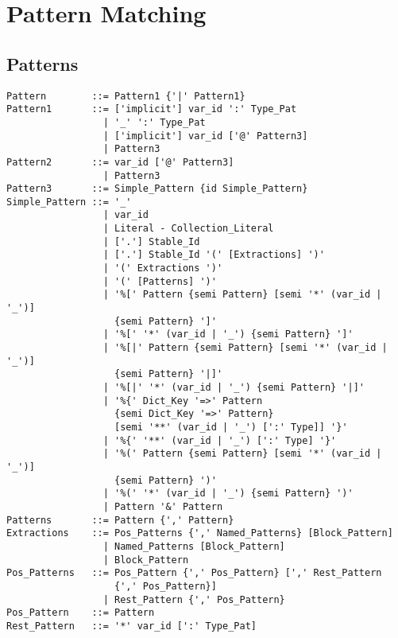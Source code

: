
\chapter{Pattern Matching}
\label{sec:pattern-matching}

\minitoc






\section{Patterns}
\label{sec:patterns}

\syntax\begin{lstlisting}
Pattern        ::= Pattern1 {'|' Pattern1}
Pattern1       ::= ['implicit'] var_id ':' Type_Pat
                 | '_' ':' Type_Pat
                 | ['implicit'] var_id ['@' Pattern3]
                 | Pattern3
Pattern2       ::= var_id ['@' Pattern3]
                 | Pattern3
Pattern3       ::= Simple_Pattern {id Simple_Pattern}
Simple_Pattern ::= '_'
                 | var_id
                 | Literal - Collection_Literal
                 | ['.'] Stable_Id
                 | ['.'] Stable_Id '(' [Extractions] ')' 
                 | '(' Extractions ')'
                 | '(' [Patterns] ')'
                 | '%[' Pattern {semi Pattern} [semi '*' (var_id | '_')] 
                   {semi Pattern} ']'
                 | '%[' '*' (var_id | '_') {semi Pattern} ']'
                 | '%[|' Pattern {semi Pattern} [semi '*' (var_id | '_')] 
                   {semi Pattern} '|]'
                 | '%[|' '*' (var_id | '_') {semi Pattern} '|]'
                 | '%{' Dict_Key '=>' Pattern 
                   {semi Dict_Key '=>' Pattern}
                   [semi '**' (var_id | '_') [':' Type]] '}'
                 | '%{' '**' (var_id | '_') [':' Type] '}'
                 | '%(' Pattern {semi Pattern} [semi '*' (var_id | '_')] 
                   {semi Pattern} ')'
                 | '%(' '*' (var_id | '_') {semi Pattern} ')'
                 | Pattern '&' Pattern
Patterns       ::= Pattern {',' Pattern}
Extractions    ::= Pos_Patterns {',' Named_Patterns} [Block_Pattern]
                 | Named_Patterns [Block_Pattern]
                 | Block_Pattern
Pos_Patterns   ::= Pos_Pattern {',' Pos_Pattern} [',' Rest_Pattern 
                   {',' Pos_Pattern}]
                 | Rest_Pattern {',' Pos_Pattern}
Pos_Pattern    ::= Pattern
Rest_Pattern   ::= '*' var_id [':' Type_Pat]

\end{lstlisting}
